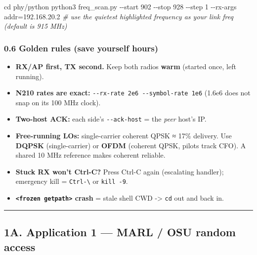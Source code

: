 \documentclass[
  9.5pt,
]{article}
\newenvironment{Shaded}{\begin{snugshade}}{\end{snugshade}}
\newcommand{\AttributeTok}[1]{\textcolor[rgb]{0.77,0.63,0.00}{#1}}
\newcommand{\BuiltInTok}[1]{#1}
\newcommand{\CommentTok}[1]{\textcolor[rgb]{0.56,0.35,0.01}{\textit{#1}}}
\newcommand{\ExtensionTok}[1]{#1}
\newcommand{\NormalTok}[1]{#1}
\providecommand{\tightlist}{%
  \setlength{\itemsep}{0pt}\setlength{\parskip}{0pt}}
\begin{document}
\begin{Shaded}
\begin{Highlighting}[]
\BuiltInTok{cd}\NormalTok{ phy/python}
\ExtensionTok{python3}\NormalTok{ freq\_scan.py }\AttributeTok{{-}{-}start}\NormalTok{ 902 }\AttributeTok{{-}{-}stop}\NormalTok{ 928 }\AttributeTok{{-}{-}step}\NormalTok{ 1 }\AttributeTok{{-}{-}rx{-}args}\NormalTok{ addr=192.168.20.2}
\CommentTok{\# use the quietest highlighted frequency as your link freq (default is 915 MHz)}
\end{Highlighting}
\end{Shaded}

\hypertarget{06-golden-rules-save-yourself-hours}{%
\subsubsection{0.6 Golden rules (save yourself
hours)}\label{06-golden-rules-save-yourself-hours}}

\begin{itemize}
\tightlist
\item
  \textbf{RX/AP first, TX second.} Keep both radios \textbf{warm}
  (started once, left running).
\item
  \textbf{N210 rates are exact:}
  \texttt{-\/-rx-rate\ 2e6\ -\/-symbol-rate\ 1e6} (1.6e6 does not snap
  on its 100 MHz clock).
\item
  \textbf{Two-host ACK:} each side's \texttt{-\/-ack-host} = the
  \emph{peer} host's IP.
\item
  \textbf{Free-running LOs:} single-carrier coherent QPSK ≈ 17\%
  delivery. Use \textbf{DQPSK} (single-carrier) or \textbf{OFDM}
  (coherent QPSK, pilots track CFO). A shared 10 MHz reference makes
  coherent reliable.
\item
  \textbf{Stuck RX won't Ctrl-C?} Press Ctrl-C again (escalating
  handler); emergency kill = \texttt{Ctrl-\textbackslash{}} or
  \texttt{kill\ -9}.
\item
  \textbf{\texttt{\textless{}frozen\ getpath\textgreater{}} crash} =
  stale shell CWD -\textgreater{} \texttt{cd} out and back in.
\end{itemize}

\begin{center}\rule{0.5\linewidth}{0.5pt}\end{center}

\hypertarget{1a-application-1--marl--osu-random-access}{%
\subsection{1A. Application 1 --- MARL / OSU random
access}\label{1a-application-1--marl--osu-random-access}}
\end{document}

